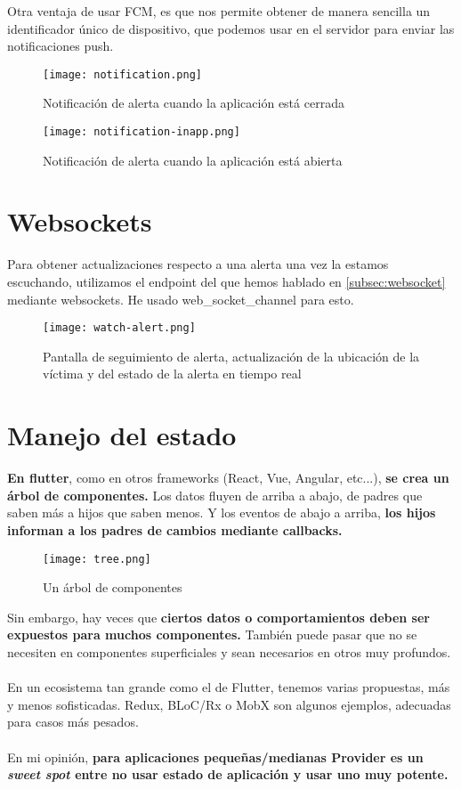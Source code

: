 Otra ventaja de usar FCM, es que nos permite obtener de manera sencilla un identificador único de dispositivo, que podemos usar en el servidor para enviar las notificaciones push.

\begin{figure}[H]
	\centering	
	\texttt{[image: notification.png]}
	\caption{Notificación de alerta cuando la aplicación está cerrada}
	\end{figure}

\begin{figure}[H]
	\centering	
	\texttt{[image: notification-inapp.png]}
	\caption{Notificación de alerta cuando la aplicación está abierta}
	\end{figure}

\section{Websockets}

Para obtener actualizaciones respecto a una alerta una vez la estamos escuchando, utilizamos el endpoint del que hemos hablado en \ref{subsec:websocket} mediante websockets.
He usado web\_socket\_channel para esto.

\begin{figure}[H]
	\centering	
	\texttt{[image: watch-alert.png]}
	\caption{Pantalla de seguimiento de alerta, actualización de la ubicación de la víctima y del estado de la alerta en tiempo real}
	\end{figure}

\section{Manejo del estado}
\textbf{En flutter}, como en otros frameworks (React, Vue, Angular, etc...), \textbf{se crea un árbol de componentes.}
Los datos fluyen de arriba a abajo, de padres que saben más a hijos que saben
menos. Y los eventos de abajo a arriba, \textbf{los hijos informan a los padres de cambios mediante callbacks.}
\begin{figure}[H]
	\centering	
	\texttt{[image: tree.png]}
	\caption{Un árbol de componentes}
	\end{figure}
Sin embargo, hay veces que \textbf{ciertos datos o comportamientos deben ser
expuestos para muchos componentes.} También puede pasar que no se necesiten
en componentes superficiales y sean necesarios en otros muy profundos. \\ \\
En un ecosistema tan grande como el de Flutter, tenemos varias propuestas, más y
menos sofisticadas. Redux, BLoC/Rx o MobX son algunos ejemplos, adecuadas
para casos más pesados.\\ \\
En mi opinión, \textbf{para aplicaciones pequeñas/medianas Provider es un \textit{sweet spot}
entre no usar estado de aplicación y usar uno muy potente.} \\ \\

